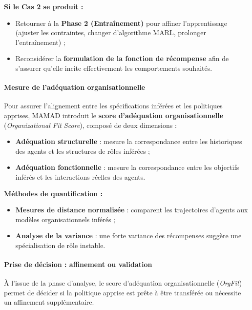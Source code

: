 \vspace{0.4em}
\noindent \textbf{Si le Cas 2 se produit :}
\begin{itemize}
    \item Retourner à la \textbf{Phase 2 (Entraînement)} pour affiner l'apprentissage (ajuster les contraintes, changer d'algorithme MARL, prolonger l'entraînement) ;
    \item Reconsidérer la \textbf{formulation de la fonction de récompense} afin de s'assurer qu'elle incite effectivement les comportements souhaités.
\end{itemize}

\paragraph{Mesure de l'adéquation organisationnelle}

Pour assurer l'alignement entre les spécifications inférées et les politiques apprises, MAMAD introduit le \textbf{score d'adéquation organisationnelle} (\textit{Organizational Fit Score}), composé de deux dimensions :

\begin{itemize}
    \item \textbf{Adéquation structurelle} : mesure la correspondance entre les historiques des agents et les structures de rôles inférées ;
    \item \textbf{Adéquation fonctionnelle} : mesure la correspondance entre les objectifs inférés et les interactions réelles des agents.
\end{itemize}

\vspace{0.4em}
\noindent \textbf{Méthodes de quantification :}
\begin{itemize}
    \item \textbf{Mesures de distance normalisée} : comparent les trajectoires d'agents aux modèles organisationnels inférés ;
    \item \textbf{Analyse de la variance} : une forte variance des récompenses suggère une spécialisation de rôle instable.
\end{itemize}

\paragraph{Prise de décision : affinement ou validation}

À l'issue de la phase d'analyse, le score d'adéquation organisationnelle (\textit{OrgFit}) permet de décider si la politique apprise est prête à être transférée ou nécessite un affinement supplémentaire.

